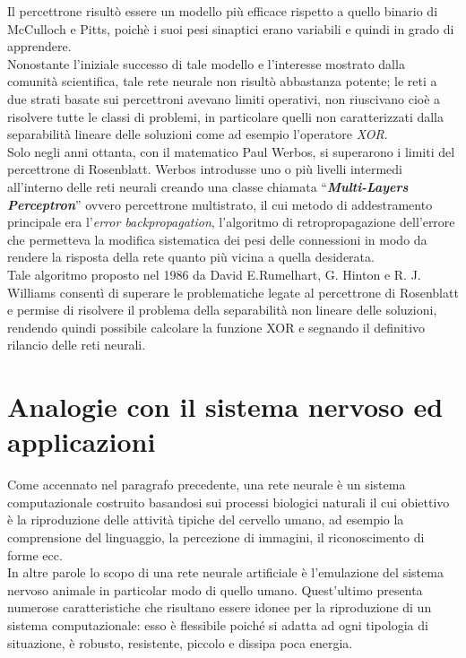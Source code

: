 \documentclass[12pt,a4paper,oneside]{book}
\begin{document}
	    Il percettrone risultò essere un modello più efficace rispetto a quello binario di McCulloch e Pitts, poichè i suoi pesi sinaptici erano variabili e quindi in grado di apprendere.\\
		Nonostante l'iniziale successo di tale modello e l'interesse mostrato dalla comunità scientifica, tale rete neurale non risultò abbastanza potente; le reti a due strati basate sui percettroni avevano limiti operativi, non riuscivano cioè a risolvere tutte le classi di problemi, in particolare quelli non caratterizzati dalla separabilità lineare delle soluzioni come ad esempio l'operatore \emph{XOR}.\\
		Solo negli anni ottanta, con il matematico Paul Werbos, si superarono i limiti del percettrone di Rosenblatt.  Werbos introdusse uno o più livelli intermedi all'interno delle reti neurali creando una classe chiamata  ``\textbf{\emph{Multi-Layers Perceptron}}'' ovvero percettrone multistrato, il cui metodo di addestramento principale era l'\emph{error backpropagation}, l'algoritmo di retropropagazione dell'errore che permetteva la modifica sistematica dei pesi delle connessioni in modo da rendere la risposta della rete quanto più vicina a quella desiderata.\\
		Tale algoritmo proposto nel 1986 da David E.Rumelhart, G. Hinton e R. J. Williams consentì di superare le problematiche legate al percettrone di Rosenblatt e permise di risolvere il problema della separabilità non lineare delle soluzioni, rendendo quindi possibile calcolare la funzione XOR e segnando il definitivo rilancio delle reti neurali.
		
		
	
	\section{Analogie con il sistema nervoso ed applicazioni}
	
		Come accennato nel paragrafo precedente, una rete neurale è un sistema computazionale costruito basandosi sui processi biologici naturali il cui obiettivo è la riproduzione delle attività tipiche del cervello umano, ad esempio la comprensione del linguaggio, la percezione di immagini, il riconoscimento di forme ecc.  \\
		In altre parole lo scopo di una rete neurale artificiale è l’emulazione del sistema nervoso animale in particolar modo di quello umano. Quest'ultimo presenta numerose caratteristiche che risultano essere idonee per la riproduzione di un sistema computazionale: esso è flessibile poiché si adatta ad ogni tipologia di situazione, è robusto, resistente, piccolo e dissipa poca energia.
		
\end{document}
